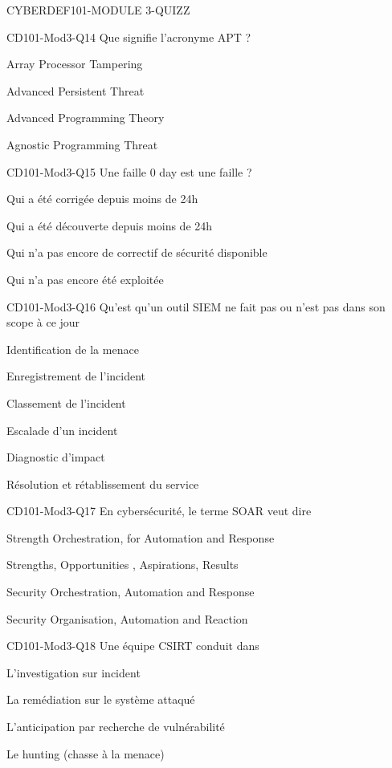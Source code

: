\documentclass[12pt]{article}
\begin{document}
\begin{quiz}{CYBERDEF101-MODULE 3-QUIZZ}
\begin{multi}[multiple=true]{CD101-Mod3-Q14}
Que signifie l’acronyme APT ?
\item Array Processor Tampering
\item* Advanced Persistent Threat
\item Advanced Programming Theory
\item Agnostic Programming Threat
\end{multi}

\begin{multi}[multiple=true]{CD101-Mod3-Q15}
Une faille 0 day est une faille ?
\item Qui a été corrigée depuis moins de 24h
\item Qui a été découverte depuis moins de 24h
\item* Qui n'a pas encore de correctif de sécurité disponible
\item Qui n'a pas encore été exploitée
\end{multi}

\begin{multi}[multiple=true]{CD101-Mod3-Q16}
Qu’est qu’un outil SIEM ne fait pas ou n’est pas dans son scope  à ce jour
\item Identification de la menace
\item Enregistrement de l’incident
\item Classement de l’incident
\item Escalade d’un incident
\item* Diagnostic d’impact
\item* Résolution et rétablissement du service
\end{multi}

\begin{multi}[multiple=true]{CD101-Mod3-Q17}
En cybersécurité, le terme  SOAR veut dire
\item Strength Orchestration, for Automation and Response 
\item Strengths, Opportunities , Aspirations, Results
\item*  Security Orchestration, Automation and Response
\item Security Organisation, Automation and Reaction
\end{multi}

\begin{multi}[multiple=true]{CD101-Mod3-Q18}
Une équipe CSIRT conduit dans 
\item* L’investigation sur incident
\item La remédiation sur le système attaqué
\item L’anticipation par recherche de vulnérabilité
\item* Le hunting (chasse à la menace)
\end{multi}


\end{quiz}
\end{document}
